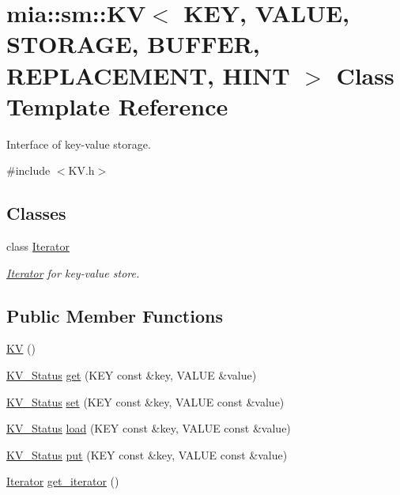 \hypertarget{classmia_1_1sm_1_1_k_v}{\section{mia\-:\-:sm\-:\-:K\-V$<$ K\-E\-Y, V\-A\-L\-U\-E, S\-T\-O\-R\-A\-G\-E, B\-U\-F\-F\-E\-R, R\-E\-P\-L\-A\-C\-E\-M\-E\-N\-T, H\-I\-N\-T $>$ Class Template Reference}
\label{classmia_1_1sm_1_1_k_v}
}


Interface of key-\/value storage.  




{\ttfamily \#include $<$K\-V.\-h$>$}

\subsection*{Classes}
\begin{DoxyCompactItemize}
\item 
class \hyperlink{classmia_1_1sm_1_1_k_v_1_1_iterator}{Iterator}
\begin{DoxyCompactList}\small\item\em \hyperlink{classmia_1_1sm_1_1_k_v_1_1_iterator}{Iterator} for key-\/value store. \end{DoxyCompactList}\end{DoxyCompactItemize}
\subsection*{Public Member Functions}
\begin{DoxyCompactItemize}
\item 
\hyperlink{classmia_1_1sm_1_1_k_v_ac29c326954aaa8f7fba96d695db77bad}{K\-V} ()
\item 
\hyperlink{namespacemia_1_1sm_a401cbf14ccf01146eb01e3a19aa5a0dc}{K\-V\-\_\-\-Status} \hyperlink{classmia_1_1sm_1_1_k_v_aa782574aa1fa0392d35d22488ce2a6d1}{get} (K\-E\-Y const \&key, V\-A\-L\-U\-E \&value)
\item 
\hyperlink{namespacemia_1_1sm_a401cbf14ccf01146eb01e3a19aa5a0dc}{K\-V\-\_\-\-Status} \hyperlink{classmia_1_1sm_1_1_k_v_af7091adedc2b8a6c01d1a284ee76bbc5}{set} (K\-E\-Y const \&key, V\-A\-L\-U\-E const \&value)
\item 
\hyperlink{namespacemia_1_1sm_a401cbf14ccf01146eb01e3a19aa5a0dc}{K\-V\-\_\-\-Status} \hyperlink{classmia_1_1sm_1_1_k_v_a92de36750b936284f2c11bf677c2e1fd}{load} (K\-E\-Y const \&key, V\-A\-L\-U\-E const \&value)
\item 
\hyperlink{namespacemia_1_1sm_a401cbf14ccf01146eb01e3a19aa5a0dc}{K\-V\-\_\-\-Status} \hyperlink{classmia_1_1sm_1_1_k_v_ac005d2482d8ac3a9e7920583ab800ab5}{put} (K\-E\-Y const \&key, V\-A\-L\-U\-E const \&value)
\item 
\hyperlink{classmia_1_1sm_1_1_k_v_1_1_iterator}{Iterator} \hyperlink{classmia_1_1sm_1_1_k_v_a4a176d678d6bb95d1e20488e82acb7d5}{get\-\_\-iterator} ()
\end{DoxyCompactItemize}


